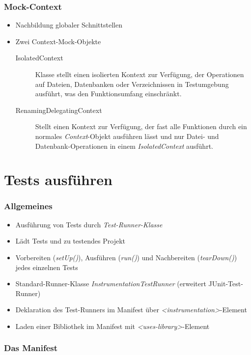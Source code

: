\begin{frame}
	\frametitle{Mock-Context}
	\begin{itemize}
		\item Nachbildung globaler Schnittstellen
		\item Zwei Context-Mock-Objekte
			\begin{description}
				\item[IsolatedContext] Klasse stellt einen isolierten Kontext zur Verfügung, 
					der Operationen auf Dateien, Datenbanken oder Verzeichnissen 
					in Testumgebung ausführt, was den Funktionsumfang einschränkt.
				\item[RenamingDelegatingContext] Stellt einen Kontext zur Verfügung, der 
					fast alle Funktionen durch ein normales \emph{Context}-Objekt ausführen lässt und 
					nur Datei- und Datenbank-Operationen in einem \emph{IsolatedContext} 
					ausführt.
			\end{description}
	\end{itemize}
\end{frame}

\section{Tests ausführen}

\begin{frame}
	\frametitle{Allgemeines}
	\begin{itemize}
		\item Ausführung von Tests durch \emph{Test-Runner-Klasse}
		\item Lädt Tests und zu testendes Projekt
		\item Vorbereiten (\emph{setUp()}), Ausführen (\emph{run()}) und Nachbereiten 
			(\emph{tearDown()}) jedes einzelnen Tests
		\item Standard-Runner-Klasse \emph{InstrumentationTestRunner} 
			(erweitert JUnit-Test-Runner)
		\item Deklaration des Test-Runners im Manifest über \emph{\textless{}instrumentation\textgreater}-Element
		\item Laden einer Bibliothek im Manifest mit \emph{\textless{}uses-library\textgreater}-Element
	\end{itemize}
\end{frame}

\begin{frame}
	\frametitle{Das Manifest}
	
\end{frame}

